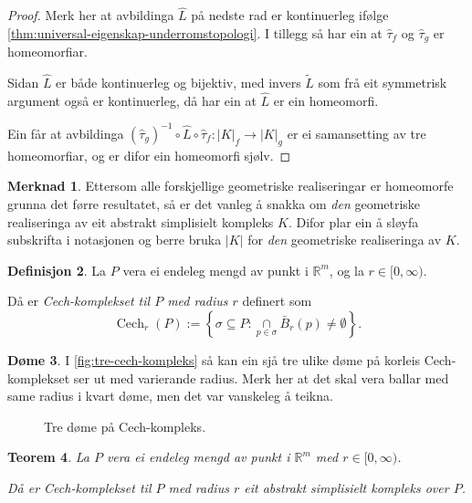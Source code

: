 \documentclass[a4paper, 12pt, norsk]{article}
\theoremstyle{plain}
\newtheorem{theorem}{Teorem}[section]
\theoremstyle{definition}
\newtheorem{definition}[theorem]{Definisjon}
\newtheorem{example}[theorem]{Døme}
\newtheorem{remark}[theorem]{Merknad}
\newcommand{\Rb}{\mathbb{R}}
\newcommand{\intersect}{ \mathop{\cap}\limits }
\newcommand{\gr}[1]{ \lvert #1 \rvert } %
\DeclareMathOperator{\Cech}{Cech} %
\begin{document}
\begin{proof}
	Merk her at avbildinga \( \hat{L} \) på nedste rad er kontinuerleg ifølge \autoref{thm:universal-eigenskap-underromstopologi}. I tillegg så har ein at \( \hat{\tau}_f \) og \( \hat{\tau}_g \) er homeomorfiar.

	Sidan $\hat{L}$ er både kontinuerleg og bijektiv, med invers $\tilde{L}$ som frå eit symmetrisk argument også er kontinuerleg, då har ein at $\hat{L}$ er ein homeomorfi.

	Ein får at avbildinga $(\hat{\tau}_g)^{-1}\circ\hat{L}\circ\hat{\tau}_f:\gr{K}_f\to\gr{K}_g$ er ei samansetting av tre homeomorfiar, og er difor ein homeomorfi sjølv.
\end{proof}

\begin{remark}
	Ettersom alle forskjellige geometriske realiseringar er homeomorfe grunna det førre resultatet, så er det vanleg å snakka om \emph{den} geometriske realiseringa av eit abstrakt simplisielt kompleks $K$. Difor plar ein å sløyfa subskrifta i notasjonen og berre bruka $\gr{K}$ for \emph{den} geometriske realiseringa av $K$.
\end{remark}

\begin{definition} \label{def:cech}
	La \( P \) vera ei endeleg mengd av punkt i \( \Rb^m \), og la \( r \in [0, \infty) \).
	
	Då er \emph{Cech-komplekset til $P$ med radius $r$} definert som
	\[
		\Cech_r(P) := \left\{\sigma\subseteq P : \intersect_{p\in\sigma}\bar{B}_r(p)\neq\emptyset\right\}.
	\]
\end{definition}

\begin{example}
	 I \autoref{fig:tre-cech-kompleks} så kan ein sjå tre ulike døme på korleis Cech-komplekset ser ut med varierande radius. Merk her at det skal vera ballar med same radius i kvart døme, men det var vanskeleg å teikna.
	\begin{figure}[htbp]
		\begin{center}
			
		\end{center}
		\caption{Tre døme på Cech-kompleks.}
		\label{fig:tre-cech-kompleks}
	\end{figure}
\end{example}

\begin{theorem} \label{thm:CASK}
	La \( P \) vera ei endeleg mengd av punkt i \( \Rb^m \) med \( r \in [0, \infty) \).
	
	Då er Cech-komplekset til $P$ med radius $r$ eit abstrakt simplisielt kompleks over $P$.
\end{theorem}
\end{document}
